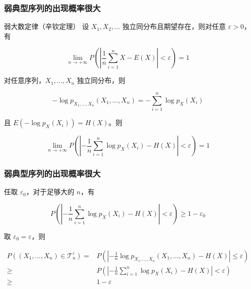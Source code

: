\documentclass{beamer}
\begin{document}
\begin{frame}
    \frametitle{弱典型序列的出现概率很大}

    \begin{block}{弱大数定律（辛钦定理）}
        设 $X_1, X_2, \dots$ 独立同分布且期望存在，则对任意 $\varepsilon > 0$，有

        \[\lim_{n\to +\infty} P\left(\left\lvert \frac{1}{n}\sum_{i = 1}^n X - E(X)\right\rvert < \varepsilon\right) = 1\]
    \end{block}

    对任意序列，$X_1, \dots, X_n$ 独立同分布，则

    \[-\log p_{X_1, \dots, X_n}(X_1, \dots, X_n) =  -\sum_{i=1}^{n} \log p_X(X_i)\]

    且 $E(-\log p_X(X_i)) = H(X)$。则

    \[\lim_{n\to +\infty} P\left(\left\lvert -\frac{1}{n}\sum_{i=1}^{n} \log p_X(X_i) - H(X)\right\rvert < \varepsilon\right) = 1\]

\end{frame}

\begin{frame}
    \frametitle{弱典型序列的出现概率很大}

    任取 $\varepsilon_0$，对于足够大的 $n$，有

    \[P\left(\left\lvert -\frac{1}{n}\sum_{i=1}^{n} \log p_X(X_i) - H(X)\right\rvert < \varepsilon\right) \geq 1 - \varepsilon_0\]

    取 $\varepsilon_0 = \varepsilon$，则

    \[\begin{split}
        P((X_1, \dots, X_n)\in \mathcal{T}_n^{\varepsilon}) = & P\left(\left\lvert-\frac{1}{n}\log p_{X_1, \dots, X_n}(X_1, \dots, X_n) - H(X)\right\rvert \leq \varepsilon\right) \\
        \geq & P\left(\left\lvert -\frac{1}{n}\sum_{i=1}^{n} \log p_X(X_i) - H(X)\right\rvert < \varepsilon\right) \\
        \geq & 1 - \varepsilon
    \end{split}\]

\end{frame}
\end{document}
